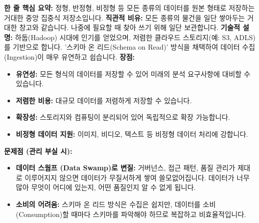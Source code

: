 \documentclass[11pt,a4paper]{article}
\begin{document}
\begin{tcolorbox}[title=\textbf{데이터 레이크 (Data Lake)}, colback=green!5!white, colframe=green!75!black, sharp corners, boxrule=0.8pt]
\textbf{한 줄 핵심 요약:} 정형, 반정형, 비정형 등 모든 종류의 데이터를 원본 형태로 저장하는 거대한 중앙 집중식 저장소입니다.
\textbf{직관적 비유:} 모든 종류의 물건을 일단 쌓아두는 거대한 창고와 같습니다. 나중에 필요할 때 찾아 쓰기 위해 일단 보관합니다.
\textbf{기술적 설명:} 하둡(Hadoop) 시대에 인기를 얻었으며, 저렴한 클라우드 스토리지(예: S3, ADLS)를 기반으로 합니다. '스키마 온 리드(Schema on Read)' 방식을 채택하여 데이터 수집(Ingestion)이 매우 유연하고 쉽습니다.
\textbf{장점:}
\begin{itemize}
    \item \textbf{유연성:} 모든 형식의 데이터를 저장할 수 있어 미래의 분석 요구사항에 대비할 수 있습니다.
    \item \textbf{저렴한 비용:} 대규모 데이터를 저렴하게 저장할 수 있습니다.
    \item \textbf{확장성:} 스토리지와 컴퓨팅이 분리되어 있어 독립적으로 확장 가능합니다.
    \item \textbf{비정형 데이터 지원:} 이미지, 비디오, 텍스트 등 비정형 데이터 처리에 강합니다.
\end{itemize}
\textbf{문제점 (관리 부실 시):}
\begin{itemize}
    \item \textbf{데이터 스웜프 (Data Swamp)로 변질:} 거버넌스, 접근 패턴, 품질 관리가 제대로 이루어지지 않으면 데이터가 무질서하게 쌓여 쓸모없어집니다. 데이터가 너무 많아 무엇이 어디에 있는지, 어떤 품질인지 알 수 없게 됩니다.
    \item \textbf{소비의 어려움:} 스키마 온 리드 방식은 수집은 쉽지만, 데이터를 소비(Consumption)할 때마다 스키마를 파악해야 하므로 복잡하고 비효율적입니다.
\end{itemize}
\end{tcolorbox}
\end{document}
